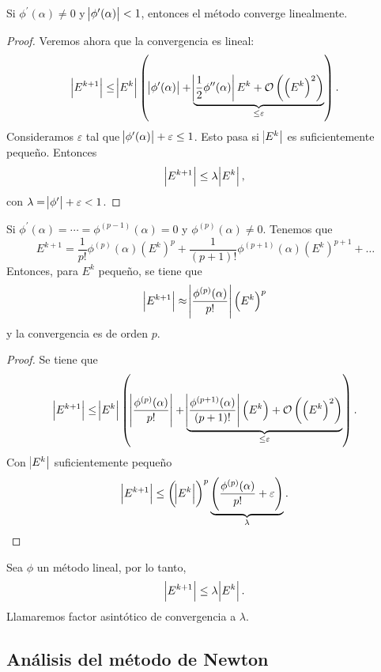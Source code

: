 \begin{prop}
    Si $\phi^\prime(\alpha) \neq 0$ y $\abs{\phi^\prime(\alpha)} < 1$, entonces el método converge linealmente.
\end{prop}

\begin{proof}
    Veremos ahora que la convergencia es lineal:
    \[
        \abs{E^{k+1}} \leq \abs{E^k} \left( \abs{\phi^\prime(\alpha)} + 
            \underbrace{\abs{\frac{1}{2} \phi^{\prime \prime}(\alpha)} E^k +
            \mathcal{O}\left( \left( E^k \right)^2 \right)}_{\leq \varepsilon} \right).
    \]
    Consideramos $\varepsilon$ tal que $\abs{\phi^\prime(\alpha)} + \varepsilon \leq 1$. Esto pasa
    si $\abs{E^k}$ es suficientemente pequeño. Entonces
    \[
        \abs{E^{k+1}} \leq \lambda \abs{E^k},
    \]
    con $\lambda = \abs{\phi^\prime} + \varepsilon < 1$.
\end{proof}

\begin{prop}
    Si $\phi^\prime(\alpha) = \cdots = \phi^{(p-1)}(\alpha) = 0$ y $\phi^{(p)}(\alpha) \neq 0$. Tenemos que
    \[
        E^{k+1} = \frac{1}{p!}\phi^{(p)}(\alpha) \left( E^k \right)^p +
        \frac{1}{(p+1)!} \phi^{(p+1)}(\alpha) \left( E^k \right)^{p+1} + \dots
    \]
    Entonces, para $E^k$ pequeño, se tiene que
    \[
        \abs{E^{k+1}} \approx \abs{\frac{\phi^{(p)}(\alpha)}{p!}} \left( E^k \right)^p
    \]
    y la convergencia es de orden $p$.
\end{prop}

\begin{proof}
    Se tiene que
    \[
        \abs{E^{k+1}} \leq \abs{E^k} \left( \abs{\frac{\phi^{(p)}(\alpha)}{p!}} +
        \underbrace{\abs{\frac{\phi^{(p+1)}(\alpha)}{(p+1)!}} \left( E^k \right) +
        \mathcal{O}\left( \left( E^k \right)^2 \right)}_{\leq \varepsilon} \right).
    \]
    Con $\abs{E^k}$ suficientemente pequeño
    \[
        \abs{E^{k+1}} \leq \left( \abs{E^k} \right)^p
        \underbrace{\left( \frac{\phi^{(p)}(\alpha)}{p!} + \varepsilon  \right)}_{\lambda}.
    \]
\end{proof}

\begin{defi}
    Sea $\phi$ un método lineal, por lo tanto,
    \[
        \abs{E^{k+1}} \leq \lambda \abs{E^k}.
    \]
    Llamaremos factor asintótico de convergencia a $\lambda$.
\end{defi}

\subsection{Análisis del método de Newton}

